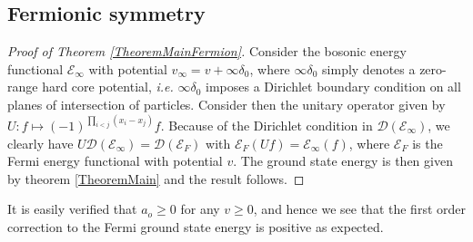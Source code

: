 \documentclass[a4paper,11pt]{article}
\newcommand{\dom}[1]{\mathcal D\left(#1\right)}
\newcommand{\ie}{\emph{i.e.} }
\numberwithin{equation}{section}
\begin{document}
\subsection{Fermionic symmetry}
		\begin{proof}[Proof of Theorem \ref{TheoremMainFermion}]
			Consider the bosonic energy functional $ \mathcal{E}_\infty $ with potential $ v_{\infty}=v+\infty\delta_0 $, where $ \infty\delta_0 $ simply denotes a zero-range hard core potential, \ie $ \infty\delta_0 $ imposes a Dirichlet boundary condition on all planes of intersection of particles. Consider then the unitary operator given by $ U:  f\mapsto (-1)^{\prod_{i<j}(x_i-x_j)}f $. Because of the Dirichlet condition in $ \dom{\mathcal{E}_\infty} $, we clearly have $ U\dom{\mathcal{E}_\infty}=\dom{\mathcal{E}_F} $ with $ \mathcal{E}_F(Uf)=\mathcal{E}_\infty(f) $, where $ \mathcal{E}_F $ is the Fermi energy functional with potential $ v $. The ground state energy is then given by theorem \ref{TheoremMain} and the result follows.
		\end{proof}
		It is easily verified that $ a_o\geq 0 $ for any $ v\geq 0 $, and hence we see that the first order correction to the Fermi ground state energy is positive as expected.
\end{document}
